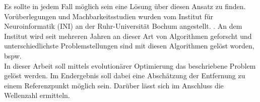 Es sollte in jedem Fall möglich sein eine Lösung über diesen Ansatz zu finden. Vorüberlegungen und Machbarkeitsstudien wurden vom Institut für Neuroinformatik (INI) an der Ruhr-Universität Bochum angestellt. \cite{Wil1,Muz1}. An dem Institut wird seit mehreren Jahren an dieser Art von Algorithmen geforscht und unterschiedlichste Problemstellungen sind mit diesen Algorithmen gelöst worden, bspw.~\cite{DBLP:conf/bildmed/RitschelDW12, DBLP:conf/bildmed/WinterRBD10}\\
%

In dieser Arbeit soll mittels evolutionärer Optimierung das beschriebene Problem gelöst werden. Im Endergebnis soll dabei eine Abschätzung der Entfernung zu einem Referenzpunkt möglich sein. Darüber lässt sich im Anschluss die Wellenzahl ermitteln.
